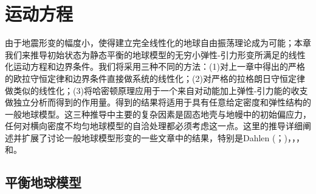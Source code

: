 \chapter{运动方程}

由于地震形变的幅度小，使得建立完全线性化的地球自由振荡理论成为可能；本章我们来推导初始状态为静态平衡的地球模型的无穷小弹性-引力形变所满足的线性化运动方程和边界条件。我们将采用三种不同的方法：(1)对上一章中得出的严格的欧拉守恒定律和边界条件直接做系统的线性化；(2)对严格的拉格朗日守恒定律做类似的线性化；(3)将哈密顿原理应用于一个来自对动能加上弹性-引力能的收支做独立分析而得到的作用量。得到的结果将适用于具有任意给定密度和弹性结构的一般地球模型。这三种推导中主要的复杂因素是固态地壳与地幔中的初始偏应力，任何对横向密度不均匀地球模型的自洽处理都必须考虑这一点。这里的推导详细阐述并扩展了讨论一般地球模型形变的一些文章中的结果，特别是Dahlen (\citeyear{dahlen72}；\citeyear{dahlen73})，\textcite{woodhouse&dahlen78}，\textcite{valette86}，和\textcite{vermeersen&vlaar91}。

\section{平衡地球模型}
%
%


